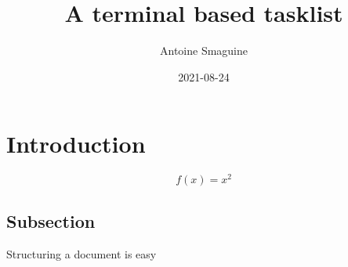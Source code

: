 \documentclass{article}
\title{A terminal based tasklist}
\date{2021-08-24}
\author{Antoine Smaguine}
\begin{document}
    \maketitle
    \newpage
    
    \section{Introduction}
    
    \begin{equation*}
        f(x) = x^2
    \end{equation*}
    
    \subsection{Subsection}

    Structuring a document is easy
\end{document}
